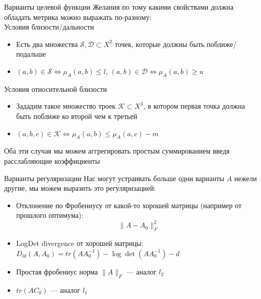 \documentclass[14pt, fleqn, xcolor={dvipsnames, table}]{beamer}
\begin{document}
\begin{frame}{Варианты целевой функции}
\small
Желания по тому какими свойствами должна обладать метрика можно выражать по-разному:\\
{\color{blue}Условия близости/дальности}\\
\footnotesize
\begin{itemize}
     \item Есть два множества $\mathcal{S}, \mathcal{D} \subset X^2$ точек, которые должны быть поближе/подальше
     \item $(a,b) \in \mathcal{S} \Leftrightarrow \mu_A(a,b) \le l$,  $(a,b) \in \mathcal{D} \Leftrightarrow \mu_A(a,b) \ge u$
\end{itemize} 
{\small\color{blue}Условия относительной близости}\\
\footnotesize
\begin{itemize}
     \item Зададим такое множество троек $\mathcal{K} \subset X^3$, в котором первая точка должна быть поближе ко второй чем к третьей
     \item $(a,b,c) \in \mathcal{K} \Leftrightarrow \mu_A(a,b) \le \mu_A(a,c) - m$
\end{itemize} 
\small
Оба эти случая мы можем аггрегировать простым суммированием введя расслабляющие коэффициенты
\end{frame}

\begin{frame}{Варианты регуляризации}
Нас могут устраивать больше одни варианты $A$ нежели другие, мы можем выразить это регуляризацией:
\begin{itemize}
  \item Отклонение по Фробениусу от какой-то хорошей матрицы (например от прошлого оптимума):
  $$
  \|A - A_0\|_F^2
  $$
  \item LogDet divergence от хорошей матрицы: $D_{ld}(A,A_0) = tr(AA_0^{-1}) - \log \det(AA_0^{-1}) - d$
  \item Простая фробениус норма $\|A\|_F$ --- аналог $l_2$
  \item $tr(AC_0)$ --- аналог $l_1$
\end{itemize}
\end{frame}
\end{document}
